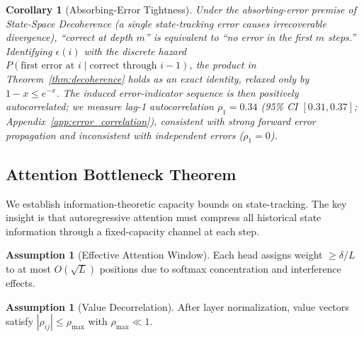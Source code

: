 \documentclass{article}
\theoremstyle{plain}
\newtheorem{corollary}[theorem]{Corollary}
\theoremstyle{definition}
\newtheorem{assumption}[theorem]{Assumption}
\theoremstyle{remark}
\begin{document}
\begin{corollary}[Absorbing-Error Tightness]
\label{cor:markov}
Under the absorbing-error premise of State-Space Decoherence (a single state-tracking error causes irrecoverable divergence), ``correct at depth $m$'' is equivalent to ``no error in the first $m$ steps.'' Identifying $\epsilon(i)$ with the discrete hazard $P(\text{first error at } i \mid \text{correct through } i-1)$, the product in Theorem~\ref{thm:decoherence} holds as an exact identity, relaxed only by $1-x \leq e^{-x}$. The induced error-indicator sequence is then positively autocorrelated; we measure lag-1 autocorrelation $\rho_1 = 0.34$ (95\% CI $[0.31, 0.37]$; Appendix~\ref{app:error_correlation}), consistent with strong forward error propagation and inconsistent with independent errors ($\rho_1 = 0$).
\end{corollary}

\subsection{Attention Bottleneck Theorem}

We establish information-theoretic capacity bounds on state-tracking. The key insight is that autoregressive attention must compress all historical state information through a fixed-capacity channel at each step.

\begin{assumption}[Effective Attention Window]
\label{ass:window}
Each head assigns weight $\geq \delta/L$ to at most $O(\sqrt{L})$ positions due to softmax concentration and interference effects.
\end{assumption}

\begin{assumption}[Value Decorrelation]
\label{ass:decorr}
After layer normalization, value vectors satisfy $|\rho_{ij}| \leq \rho_{\max}$ with $\rho_{\max} \ll 1$.
\end{assumption}
\end{document}
